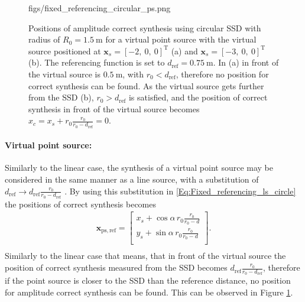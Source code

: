 \documentclass[12pt,a4paper]{article}
\newcommand{\dref}{d_{\mathrm{ref}}}
\begin{document}
\begin{figure}
	\centering
	\begin{overpic}[width = 1\columnwidth]{figs/fixed_referencing_circular_ps.png}
	\end{overpic}
\caption{ Positions of amplitude correct synthesis using circular SSD with radius of $R_0 = 1.5~\mathrm{m}$ for a virtual point source with the virtual source positioned at $\mathbf{x}_s = [-2,\ 0,\ 0]^{\mathrm{T}}$ (a) and $\mathbf{x}_s = [-3,\ 0,\ 0]^{\mathrm{T}}$ (b). The referencing function is set to $\dref = 0.75~\mathrm{m}$. In (a) in front of the virtual source is $0.5~\mathrm{m}$, with $r_0< \dref$, therefore no position for correct synthesis can be found. As the virtual source gets further from the SSD (b), $r_0> \dref$ is satisfied, and the position of correct synthesis in front of the virtual source becomes $x_c = x_s + r_0\frac{r_0}{r_0-\dref} = 0$. }
	\label{Fig:Theory:fixed_referencing_circular_ps}
\end{figure}
\paragraph{Virtual point source:\\}
Similarly to the linear case, the synthesis of a virtual point source may be considered in the same manner as a line source, with a substitution of $\dref \rightarrow \dref \frac{r_0}{r_0 - \dref}$ . By using this substitution in \eqref{Eq:Fixed_referencing_ls_circle} the positions of correct synthesis becomes
\begin{eqnarray}
\mathbf{x}_{\mathrm{ps, ref}} =  \begin{bmatrix} x_s + \cos\alpha \, r_0 \frac{r_0}{r_0 - d}  \\[0.3em] y_s + \sin\alpha\, r_0 \frac{r_0}{r_0 - d} \\[0.3em]    \end{bmatrix}. \\
\label{Eq:Fixed_referencing_ps_circle}
\end{eqnarray}
Similarly to the linear case that means, that in front of the virtual source the position of correct synthesis measured from the SSD becomes $\dref \frac{r_0}{r_0- \dref}$, therefore if the point source is closer to the SSD than the reference distance, no position for amplitude correct synthesis can be found. This can be observed in Figure \ref{Fig:Theory:fixed_referencing_circular_ps}.
\end{document}
